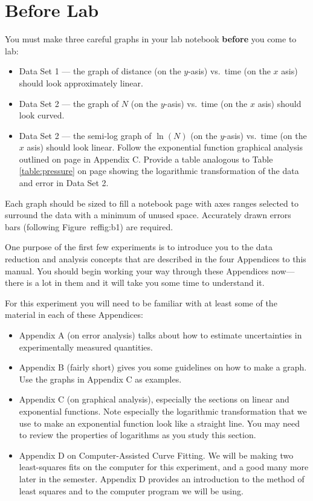 \newexp

\section*{Before Lab}
You must make three careful graphs in your lab notebook
{\bf before} you come to lab: 
\begin{itemize}
\item Data Set 1 --- the graph of distance (on the $y$-asis) vs.\ time (on the
$x$ asis) should look approximately linear.
\item Data Set 2 --- the graph of $N$ (on the $y$-asis) vs.\ time (on the
$x$ asis) should look curved.
\item Data Set 2 --- the semi-log graph of $\ln(N)$ (on the $y$-asis) vs.\ time (on the
$x$ asis) should look linear.  Follow the exponential function graphical
analysis outlined on page \pageref{exprel} in Appendix C. 
Provide a table analogous to Table \ref{table:pressure} on page
\pageref{table:pressure} showing the logarithmic transformation of the data and error
in Data Set 2.
\end{itemize}
Each graph should be sized to fill a notebook
page with axes ranges selected to surround the data with a minimum of unused space.
Accurately drawn errors bars (following Figure~ref{fig:b1}) are required.


One purpose of the first few experiments is to introduce you to
the data reduction and analysis concepts that are described in the
four Appendices to this manual.  You should begin working your way
through these Appendices now---there is a lot in them and it will take
you some time to understand it.

For this experiment you will need to be familiar with at least some
of the material in each of these Appendices:
\begin{itemize}
\item Appendix A (on error analysis) talks about how to estimate uncertainties
in experimentally measured quantities.
\item Appendix B (fairly short) gives you some guidelines on how to make a graph.
Use the graphs in Appendix C as examples.
%
\item Appendix C (on graphical analysis), especially the sections on linear
and exponential functions.  Note especially the logarithmic transformation that we
use to make an exponential function look like a straight line.  You may need
to review the properties of logarithms as you study this section.
%
\item Appendix D on Computer-Assisted Curve Fitting.  We will be making
two least-squares fits on the computer for this experiment, and a good many
more later in the semester.  Appendix D provides an introduction to
the method of least squares and to the computer program we will be
using.
\end{itemize}

